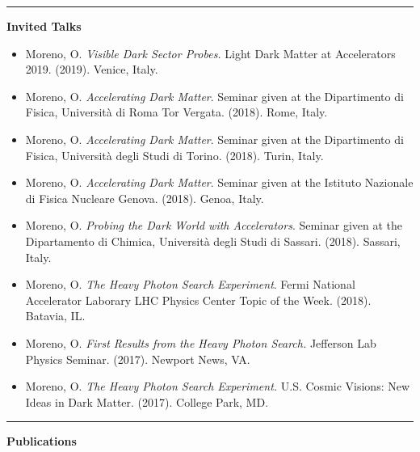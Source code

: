 \documentclass[11pt]{article}
\newcommand{\cvsection}[1] {
    \noindent
    \textcolor{indigodye}{\rule{.15\textwidth}{.1in} \hspace{0.01 \textwidth} \textbf{\Large{#1}}} \newline 
}
\begin{document}
    \clearpage
    \cvsection{Invited Talks}
        \vspace{-11pt}
        \begin{itemize}[label=\textcolor{indigodye}{$\circ$}, noitemsep, nolistsep, leftmargin=.03\textwidth]
            \item Moreno, O. \emph{Visible Dark Sector Probes.}
                  Light Dark Matter at Accelerators 2019. (2019). Venice, Italy. 
            \item Moreno, O. \emph{Accelerating Dark Matter}. 
                  Seminar given at the Dipartimento di Fisica, Università di Roma Tor Vergata.
                  (2018). Rome, Italy.
            \item Moreno, O. \emph{Accelerating Dark Matter}. 
                  Seminar given at the Dipartimento di Fisica, Università degli Studi di Torino.
                  (2018). Turin, Italy.  
            \item Moreno, O. \emph{Accelerating Dark Matter}. 
                  Seminar given at the Istituto Nazionale di Fisica Nucleare Genova.
                  (2018). Genoa, Italy. 
            \item Moreno, O. \emph{Probing the Dark World with Accelerators}. 
                  Seminar given at the Dipartamento di Chimica, Università degli Studi di Sassari.
                  (2018). Sassari, Italy. 
            \item Moreno, O. \emph{The Heavy Photon Search Experiment}. 
                  Fermi National Accelerator Laborary LHC Physics Center Topic of the Week. (2018). Batavia, IL.
            \item Moreno, O. \emph{First Results from the Heavy Photon Search.}
                  Jefferson Lab Physics Seminar. (2017). Newport News, VA.
            \item Moreno, O. \emph{The Heavy Photon Search Experiment.}
                  U.S. Cosmic Visions: New Ideas in Dark Matter. (2017). College Park, MD.  
        \end{itemize}
        \vspace{11pt}

    \cvsection{Publications}
    \vspace{-22pt}
\end{document}
